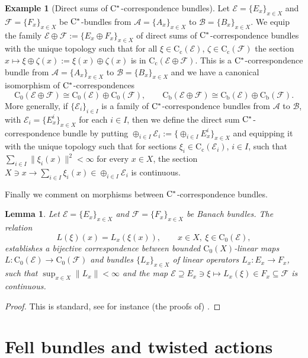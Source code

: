\documentclass[11 pt, leqno]{amsart}
\numberwithin{equation}{section}
\theoremstyle{plain}
\newtheorem {lem} [thm]{Lemma}
\theoremstyle{definition}
\newtheorem{ex}[thm]{Example}
\newcommand*{\contc}{\mathrm{C_c}}%
\newcommand*{\contz}{\mathrm{C_0}}%
\newcommand*{\contb}{\mathrm{C_b}}%
\newcommand{\B}{\mathcal B}
\newcommand{\EE}{\mathcal E}
\newcommand{\FF}{\mathcal F}
\newcommand{\A}{\mathcal A}
\newcommand{\cst}{\ifmmode\mathrm{C}^*\else{$\mathrm{C}^*$}\fi}
\begin{document}
\begin{ex}[Direct sums of $\cst$-correspondence bundles] 
Let $\EE=\{E_x\}_{x\in X}$ and $\FF=\{F_x\}_{x\in X}$ be $\cst$-bundles from $\A=\{A_x\}_{x\in X}$ to $\B=\{B_x\}_{x\in X}$. 
We equip the family $\EE\oplus\FF:=\{E_x\oplus F_x\}_{x\in X}$ of direct sums of $\cst$-correspondence bundles with the unique topology such that for all $\xi\in \contc(\EE)$, $\zeta\in \contc(\FF)$ the section $ x\mapsto\xi\oplus \zeta(x):=\xi(x)\oplus \zeta(x)$ is in $\contc(\EE\oplus\FF )$. 
This is a $\cst$-correspondence bundle  from $\A=\{A_x\}_{x\in X}$ to $\B=\{B_x\}_{x\in X}$ and we have a canonical isomorphism of $\cst$-correspondences 
\[
    \contz(\EE\oplus\FF)\cong \contz(\EE)\oplus \contz(\FF), \qquad \contb(\EE\oplus\FF)\cong \contb(\EE)\oplus\contb(\FF).
\]
More generally, if $\{\EE_i\}_{i\in I}$ is a family of $\cst$-correspondence bundles from $\A$ to $\B$, with $\EE_i=\{E_x^i\}_{x \in X}$ for each $i \in I$, then we define the direct sum $\cst$-correspondence bundle by putting $\oplus_{i\in I} \EE_i:= \{\oplus_{i\in I} E_x^i\}_{x\in X}$ and equipping it with the unique topology such that for sections $\xi_i\in \contc(\EE_i)$, $i\in I$, such that $\sum_{i\in I} \|\xi_i(x)\|^2<\infty$ for every $x\in X$, the section $X\ni x \to \sum_{i\in I} \xi_i(x)\in \oplus_{i\in I} \EE_i$ is continuous.
\end{ex}

Finally we comment on morphisms between $\cst$-correspondence bundles.
	
\begin{lem}\label{lem:morphisms_disintegration} 
Let $\EE=\{E_x\}_{x\in X}$ and $\FF=\{F_x\}_{x\in X}$ be Banach bundles. 
The relation
\[
    L(\xi)(x)=L_{x}(\xi(x)) , \qquad x\in X,\ \xi \in \contz(\EE),
\]
establishes a bijective correspondence between bounded $\contz(X)$-linear maps $L:\contz(\EE)\to \contz(\FF)$ and bundles $\{L_{x}\}_{x\in X}$ of linear operators $L_x:E_x\to F_x$, such that $\sup_{x\in X}\|L_x\|<\infty$ and the map $\EE\supseteq E_x\ni \xi \longmapsto L_x(\xi)\in F_x\subseteq \FF$ is continuous. 
\end{lem}
\begin{proof}
This is standard, see for instance (the proofs of) \cite[Propositions 3.2, 3.5]{Bartosz}. 
\end{proof}



%
%
\section{Fell bundles and twisted actions} 
\label{Sec:Fell_bundles}
\end{document}
